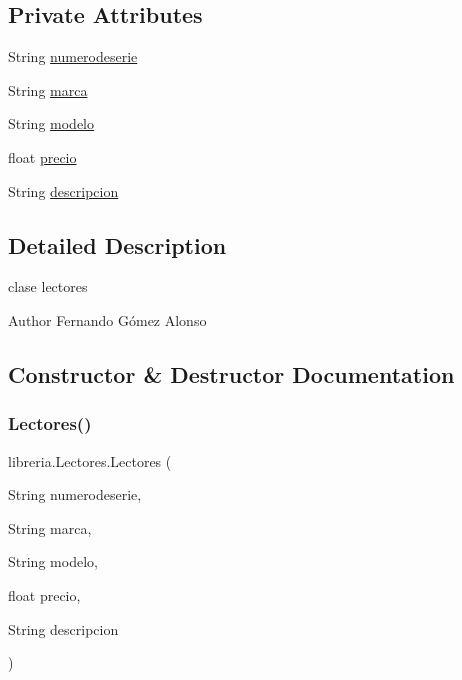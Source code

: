 \subsection*{Private Attributes}
\begin{DoxyCompactItemize}
\item 
String \mbox{\hyperlink{classlibreria_1_1_lectores_acfa30a33712a3e927a4157c46e22dfd2}{numerodeserie}}
\item 
String \mbox{\hyperlink{classlibreria_1_1_lectores_ad062e7b5e6ca8443096c555db878b5c5}{marca}}
\item 
String \mbox{\hyperlink{classlibreria_1_1_lectores_a1182864ccd674c11609aacc288bb7605}{modelo}}
\item 
float \mbox{\hyperlink{classlibreria_1_1_lectores_ae03623755bede2e0f37e40f2cea3fa2f}{precio}}
\item 
String \mbox{\hyperlink{classlibreria_1_1_lectores_a3e79587af255ae572a923c0158f00f2a}{descripcion}}
\end{DoxyCompactItemize}


\subsection{Detailed Description}
clase lectores \begin{DoxyAuthor}{Author}
Fernando Gómez Alonso 
\end{DoxyAuthor}


\subsection{Constructor \& Destructor Documentation}
\mbox{\label{classlibreria_1_1_lectores_a75b63ca81b94c72a5a75932a9e8f5e88}} 
\subsubsection{\texorpdfstring{Lectores()}{Lectores()}}
{\footnotesize\ttfamily libreria.\+Lectores.\+Lectores (\begin{DoxyParamCaption}\item[{String}]{numerodeserie,  }\item[{String}]{marca,  }\item[{String}]{modelo,  }\item[{float}]{precio,  }\item[{String}]{descripcion }\end{DoxyParamCaption})\hspace{0.3cm}{\ttfamily [inline]}}

